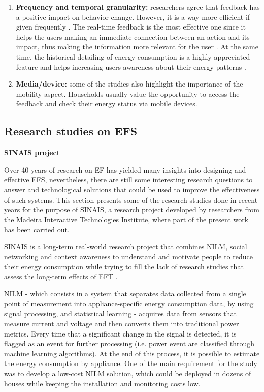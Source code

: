 \begin{enumerate}
\item \textbf{Frequency and temporal granularity:}
researchers agree that feedback has a positive impact on behavior change. However, it is a way more efficient if given frequently \cite{Feedbackonhouseholdelectricityconsumption:atoolforsavingenergy?}. The real-time feedback is the most effective one \cite{Froehlich2010} since it helps the users making an immediate connection between an action and its impact, thus making the information more relevant for the user \cite{Fitzpatrick2009}. At the same time, the historical detailing of energy consumption is a highly appreciated feature \cite{Giulio2009, Petkov2011} and helps increasing users awareness about their energy patterns \cite{Fitzpatrick2009}.

\item \textbf{Media/device:}
some of the studies \cite{Fitzpatrick2009, Froehlich2010, Pereira2013} also highlight the importance of the mobility aspect. Households usually value the opportunity to access the feedback and check their energy status via mobile devices.

\end{enumerate}

\subsection{Research studies on EFS}

\textbf{\ac{SINAIS} project}


Over 40 years of research on \ac{EF} has yielded many insights into designing and effective \ac{EFS}, nevertheless, there are still some interesting research questions to answer and technological solutions that could be used to improve the effectiveness of such systems. This section presents some of the research studies done in recent years for the purpose of \ac{SINAIS}, a research project developed by researchers from the Madeira Interactive Technologies Institute, where part of the present work has been carried out.


\ac{SINAIS} is a long-term real-world research project that combines \ac{NILM}, social networking and context awareness to understand and motivate people to reduce their energy consumption while trying to fill the lack of research studies that assess the long-term effects of \ac{EFT} \cite{Pereira2012}.


\ac{NILM} - which consists in a system that separates data collected from a single point of measurement into appliance-specific energy consumption data, by using signal processing, and statistical learning - acquires data from sensors that measure current and voltage and then converts them into traditional power metrics. Every time that a significant change in the signal is detected, it is flagged as an event for further processing (i.e. power event are classified through machine learning algorithms). At the end of this process, it is possible to estimate the energy consumption by appliance. One of the main requirement for the study was to develop a low-cost \ac{NILM} solution, which could be deployed in dozens of houses while keeping the installation and monitoring costs low.


